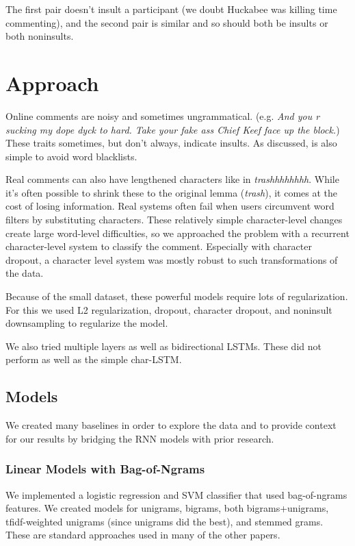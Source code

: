 \documentclass{article} %
\begin{document}
The first pair doesn't insult a participant (we doubt Huckabee was killing time commenting), and the second pair is similar and so should both be insults or both noninsults. 
\section*{Approach}
Online comments are noisy and sometimes ungrammatical. (e.g. \textit{And you r sucking my dope dyck to hard. Take your fake ass Chief Keef face up the block.}) These traits sometimes, but don’t always, indicate insults. As discussed, is also simple to avoid word blacklists. 

Real comments can also have lengthened characters like in \textit{trashhhhhhhh}. While it’s often possible to shrink these to the original lemma (\textit{trash}), it comes at the cost of losing information. Real systems often fail when users circumvent word filters by substituting characters. These relatively simple character-level changes create large word-level difficulties, so we approached the problem with a recurrent character-level system to classify the comment. Especially with character dropout, a character level system was mostly robust to such transformations of the data. 

Because of the small dataset, these powerful models require lots of regularization. For this we used L2 regularization, dropout, character dropout, and noninsult downsampling to regularize the model. 

We also tried multiple layers as well as bidirectional LSTMs. These did not perform as well as the simple char-LSTM. 

\subsection*{Models}
We created many baselines in order to explore the data and to provide context for our results by bridging the RNN models with prior research. 

\subsubsection*{Linear Models with Bag-of-Ngrams}
We implemented a logistic regression and SVM classifier that used bag-of-ngrams features. We created models for unigrams, bigrams, both bigrams+unigrams, tfidf-weighted unigrams (since unigrams did the best), and stemmed grams. These are standard approaches used in many of the other papers.
\end{document}
